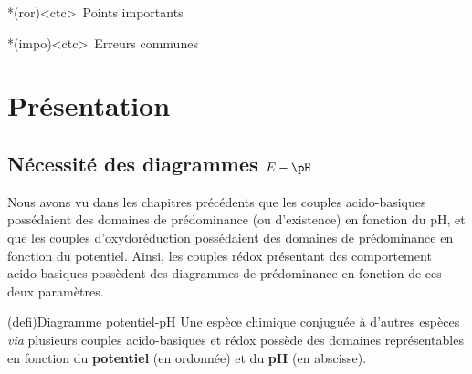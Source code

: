 \documentclass[../../main/main.tex]{subfiles}
\begin{document}
\begin{tcb}
	\begin{tcb}*(ror)<ctc>{\iconhart~Points importants}
	\end{tcb}
	\begin{tcb}*(impo)<ctc>{\iconimpo~Erreurs communes}
	\end{tcb}
\end{tcb}

\newpage

\section{Présentation}
\subsection{Nécessité des diagrammes $E-\pH$}
Nous avons vu dans les chapitres précédents que les couples acido-basiques
possédaient des domaines de prédominance (ou d'existence) en fonction du pH, et
que les couples d'oxydoréduction possédaient des domaines de prédominance en
fonction du potentiel. Ainsi, les couples rédox présentant des comportement
acido-basiques possèdent des diagrammes de prédominance en fonction de ces deux
paramètres.

\begin{tcb*}(defi){Diagramme potentiel-pH}
	Une espèce chimique conjuguée à d'autres espèces \textit{via} plusieurs
	couples acido-basiques et rédox possède des domaines représentables en
	fonction du \textbf{potentiel} (en ordonnée) et du \textbf{pH} (en abscisse).
\end{tcb*}
\end{document}
